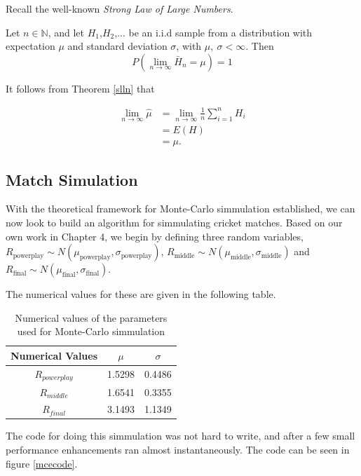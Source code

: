 Recall the well-known \textit{Strong Law of Large Numbers}.

\begin{theorem}
    \label{slln}
    Let $n \in \mathbb{N}$, and let $H_1$,$H_2$,... be an i.i.d sample from a distribution with expectation $\mu$ and standard deviation $\sigma$, with $\mu, \ \sigma < \infty$.
    Then 
    $$ 
        P\left( \lim_{n \to \infty} \bar{H}_n = \mu \right) = 1
    $$
\end{theorem}

It follows from Theorem \ref{slln} that

\begin{align}
\lim_{n \to \infty} \hat{\mu} &= \lim_{n \to \infty} \frac{1}{n}\sum_{i=1}^nH_i \\
                              &= E(H) \\
                              &= \mu.
\end{align}

\subsection{Match Simulation}
With the theoretical framework for Monte-Carlo simmulation established, we can now look to build an algorithm for simmulating cricket matches. Based on our own work in Chapter 4, 
we begin by defining three random variables, $R_{\text{powerplay}} \sim N(\mu_{\text{powerplay}},\sigma_\text{powerplay})$, $R_{\text{middle}} \sim N(\mu_{\text{middle}},\sigma_{\text{middle}})$
and $R_{\text{final}} \sim N(\mu_{\text{final}},\sigma_{\text{final}})$.

The numerical values for these are given in the following table.

\begin{table}[h]
    \centering
    \begin{tabular}{c | c | c}
        Numerical Values & $\mu$ & $\sigma$ \\
        \hline
        $R_{powerplay}$ & 1.5298 & 0.4486 \\
        $R_{middle}$ & 1.6541 & 0.3355 \\
        $R_{final}$ & 3.1493 & 1.1349 
    \end{tabular}
    \caption{Numerical values of the parameters used for Monte-Carlo simmulation}
\end{table}

The code for doing this simmulation was not hard to write, and after a few small performance enhancements ran almost instantaneously. The code can be seen in figure \ref{mcecode}.

